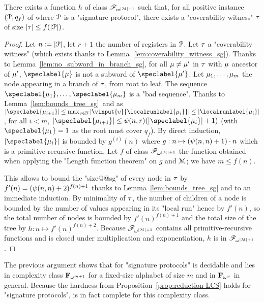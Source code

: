 \begin{proposition}
\label{prop:bounded_witness_sg}
There exists a function $h$ of class $\mathscr{F}_{w^{|\mathcal{M}|+1}}$ such that, 
for all positive instance $(\mathcal{P}, q_f)$ of \COVER where $\mathcal{P}$ is a "signature protocol", there exists a "coverability witness" $\tau$ of size $|\tau| \leq f(|\mathcal{P}|)$.
\end{proposition}
\begin{proof}
Let $n := |\mathcal{P}|$, let $r+1$ the number of registers in $\mathcal{P}$. 
Let $\tau$ a "coverability witness" (which exists thanks to Lemma~\ref{lem:coverability_witness_sg}). Thanks to Lemma~\ref{lem:no_subword_in_branch_sg}, for all $\mu \ne \mu'$ in 
$\tau$ with $\mu$ ancestor of $\mu'$, $\speclabel{\node}$ is not a subword of $\speclabel{\node'}$.  Let $\mu_1, \dots, \mu_m$ the node appearing in a branch of $\tau$, from root to leaf. The sequence $\speclabel{\node_1}, \dots, \speclabel{\node_m}$ is a "bad sequence".
Thanks to Lemma~\ref{lem:bounds_tree_sg}\ and as $\size{\speclabel{\node_{i+1}}} \leq \max_{v \in \nats} \size{\vinput{v}{\localrunlabel{\node_i}}} \leq \size{\localrunlabel{\node_i}}$, for all $i<m$, $\size{\speclabel{\node_{i+1}}} \leq \towerfun(n,r) (\size{\speclabel{\node_{i}}} +1)$ (with $\speclabel{\node_1} = 1$ as the root must cover $q_f$). By direct induction, $\size{\speclabel{\node_i}}$ is bounded by $g^{(i)}(n)$ where $g: n \mapsto (\psi(n,n)+1) \cdot n$ which is a primitive-recursive function. Let $f$ of class $\mathscr{F}_{\omega^{|\mathcal{M}|+1}}$ the function obtained when applying the "Length function theorem" on $g$ and $\mathcal{M}$; we have $m \leq f(n)$. 

This allows to bound the "size@@sg" of every node in $\tau$ by $f'(n) = (\psi(n,n)+2)^{f(n) + 1}$ thanks to Lemma~\ref{lem:bounds_tree_sg} and to an immediate induction. 
By minimality of $\tau$, the number of children of a node is bounded by the number of values appearing in its "local run" hence by $f'(n)$, so the total number of nodes is bounded by $f'(n)^{f(n)+1}$ and the total size of the tree by $h:n \mapsto f'(n)^{f(n)+2}$. Because $\mathscr{F}_{\omega^{|\mathcal{M}|+1}}$ contains all primitive-recursive functions and is closed under multiplication and exponentiation, $h$ is in $\mathscr{F}_{\omega^{|\mathcal{M}|+1}}$.
\end{proof}

The previous argument shows that \COVER for "signature protocols" is decidable and lies in complexity class $\mathbf{F}_{\omega^{m+1}}$ for a fixed-size alphabet of size $m$ and in $\mathbf{F}_{\omega^\omega}$ in general. Because the hardness from Proposition~\ref{prop:reduction-LCS} holds for "signature protocols", \COVER is in fact complete for this complexity class.

